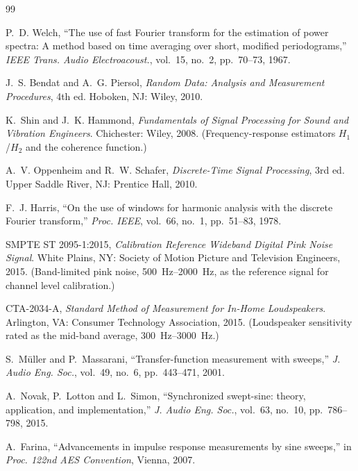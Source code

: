 \begin{thebibliography}{99}

P.~D. Welch, ``The use of fast Fourier transform for the estimation of power
spectra: A method based on time averaging over short, modified periodograms,''
\textit{IEEE Trans. Audio Electroacoust.}, vol.~15, no.~2, pp.~70--73, 1967.

J.~S. Bendat and A.~G. Piersol, \textit{Random Data: Analysis and Measurement
Procedures}, 4th ed. Hoboken, NJ: Wiley, 2010.

K.~Shin and J.~K. Hammond, \textit{Fundamentals of Signal Processing for Sound
and Vibration Engineers}. Chichester: Wiley, 2008. (Frequency-response
estimators $H_1$/$H_2$ and the coherence function.)

A.~V. Oppenheim and R.~W. Schafer, \textit{Discrete-Time Signal Processing},
3rd ed. Upper Saddle River, NJ: Prentice Hall, 2010.

F.~J. Harris, ``On the use of windows for harmonic analysis with the discrete
Fourier transform,'' \textit{Proc. IEEE}, vol.~66, no.~1, pp.~51--83, 1978.

SMPTE ST 2095-1:2015, \textit{Calibration Reference Wideband Digital Pink
Noise Signal}. White Plains, NY: Society of Motion Picture and Television
Engineers, 2015. (Band-limited pink noise, \SIrange{500}{2000}{\hertz}, as
the reference signal for channel level calibration.)

CTA-2034-A, \textit{Standard Method of Measurement for In-Home Loudspeakers}.
Arlington, VA: Consumer Technology Association, 2015. (Loudspeaker
sensitivity rated as the mid-band average, \SIrange{300}{3000}{\hertz}.)

S.~Müller and P.~Massarani, ``Transfer-function measurement with sweeps,''
\textit{J. Audio Eng. Soc.}, vol.~49, no.~6, pp.~443--471, 2001.

A.~Novak, P.~Lotton and L.~Simon, ``Synchronized swept-sine: theory,
application, and implementation,'' \textit{J. Audio Eng. Soc.}, vol.~63,
no.~10, pp.~786--798, 2015.

A.~Farina, ``Advancements in impulse response measurements by sine sweeps,''
in \textit{Proc. 122nd AES Convention}, Vienna, 2007.


\end{thebibliography}
